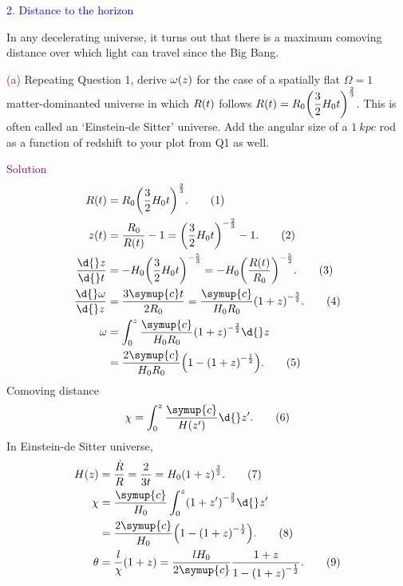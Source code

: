 \documentclass[UTF8, 12pt, a4paper, oneside, twocolumn, fontset=none]{ctexart}
\begin{document}
\hspace*{\fill}

\noindent\textcolor{blue}{2. Distance to the horizon}

\noindent In any decelerating universe, it turns out that there is a maximum comoving distance over which light can travel since the Big Bang.

\hspace*{\fill}

\noindent\textcolor{purple}{(a)} Repeating Question 1, derive $\omega\mleft(z\mright)$ for the case of a spatially flat $\Omega=1$ matter-dominanted universe in which $R\mleft(t\mright)$ follows $R\mleft(t\mright)=R_{0}\mleft(\dfrac{3}{2}H_{0}t\mright)^{\frac{2}{3}}$. This is often called an `Einstein-de Sitter' universe. Add the angular size of a $\qty{1}{kpc}$ rod as a function of redshift to your plot from Q1 as well.

\hspace*{\fill}

\noindent\textcolor{purple}{Solution}
\begin{align}
R\mleft(t\mright)&=R_{0}\mleft(\frac{3}{2}H_{0}t\mright)^{\frac{2}{3}}.\tag{1}\\
z\mleft(t\mright)&=\frac{R_{0}}{R\mleft(t\mright)}-1=\mleft(\frac{3}{2}H_{0}t\mright)^{-\frac{2}{3}}-1.\tag{2}\\
\frac{\d{}z}{\d{}t}&=-H_{0}\mleft(\frac{3}{2}H_{0}t\mright)^{-\frac{5}{3}}=-H_{0}\mleft(\frac{R\mleft(t\mright)}{R_{0}}\mright)^{-\frac{5}{2}}.\tag{3}\\
\frac{\d{}\omega}{\d{}z}&=\frac{3\symup{c}t}{2R_{0}}=\frac{\symup{c}}{H_{0}R_{0}}\mleft(1+z\mright)^{-\frac{3}{2}}.\tag{4}\\
\omega&=\int_{0}^{z}\frac{\symup{c}}{H_{0}R_{0}}\mleft(1+z\mright)^{-\frac{3}{2}}\d{}z\notag\\
&=\frac{2\symup{c}}{H_{0}R_{0}}\mleft(1-\mleft(1+z\mright)^{-\frac{1}{2}}\mright).\tag{5}
\end{align}
Comoving distance
\begin{equation}
\chi=\int_{0}^{z}\frac{\symup{c}}{H\mleft(z'\mright)}\d{}z'.\tag{6}
\end{equation}
In Einstein-de Sitter universe,
\begin{align}
H\mleft(z\mright)&=\frac{\dot{R}}{R}=\frac{2}{3t}=H_{0}\mleft(1+z\mright)^{\frac{3}{2}}.\tag{7}\\
\chi&=\frac{\symup{c}}{H_{0}}\int_{0}^{z}\mleft(1+z'\mright)^{-\frac{3}{2}}\d{}z'\notag\\
&=\frac{2\symup{c}}{H_{0}}\mleft(1-\mleft(1+z\mright)^{-\frac{1}{2}}\mright).\tag{8}\\
\theta&=\frac{l}{\chi}\mleft(1+z\mright)=\frac{lH_{0}}{2\symup{c}}\frac{1+z}{1-\mleft(1+z\mright)^{-\frac{1}{2}}}.\tag{9}
\end{align}
\end{document}
